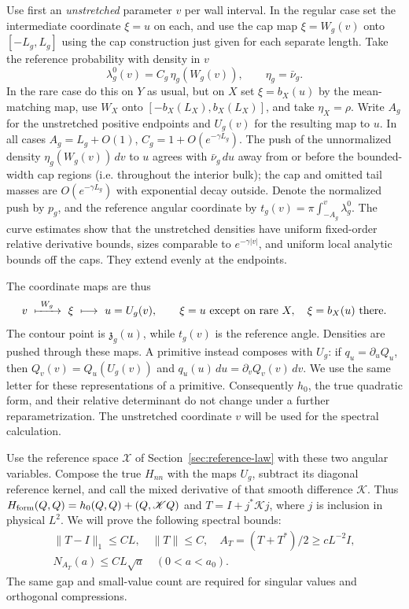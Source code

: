 Use first an \emph{unstretched} parameter $v$ per wall interval. In the regular case set the intermediate coordinate \(\xi=u\) on each, and use the cap map \(\xi=W_g(v)\) onto \([-L_g,L_g]\) using the cap construction just given for each separate length. Take the reference probability with density in \(v\)
\[
 \lambda_g^0(v)=C_g\,\eta_g(W_g(v)),\qquad \eta_g=\bar\nu_g .
\]
In the rare case do this on \(Y\) as usual, but on \(X\) set \(\xi=b_X(u)\) by the mean-matching map, use \(W_X\) onto \([-b_X(L_X),b_X(L_X)]\), and take \(\eta_X=\rho\). Write \(A_g\) for the unstretched positive endpoints and \(U_g(v)\) for the resulting map to \(u\). In all cases \(A_g=L_g+O(1)\), \(C_g=1+O(e^{-\gamma L_g})\). The push of the unnormalized density \(\eta_g(W_g(v))\,dv\) to \(u\) agrees with \(\bar\nu_g\,du\) away from or before the bounded-width cap regions (i.e. throughout the interior bulk); the cap and omitted tail masses are \(O(e^{-\gamma L_g})\) with exponential decay outside. Denote the normalized push by \(p_g\), and the reference angular coordinate by \(t_g(v)=\pi\int_{-A_g}^v\lambda_g^0\). The curve estimates show that the unstretched densities have uniform fixed-order relative derivative bounds, sizes comparable to $e^{-\gamma|v|}$, and uniform local analytic bounds off the caps. They extend evenly at the endpoints.

The coordinate maps are thus
\[
 v\ \xmapsto{\ W_g\ }\ \xi\ \longmapsto\ u=U_g(v),
 \qquad
 \xi=u\ \text{except on rare }X,\quad \xi=b_X(u)\ \text{there}.
\]
The contour point is $\mathfrak z_g(u)$, while $t_g(v)$ is the
reference angle. Densities are pushed through these maps. A primitive
instead composes with $U_g$: if $q_u=\partial_uQ_u$,
then $Q_v(v)=Q_u(U_g(v))$ and $q_u(u)\,du=\partial_vQ_v(v)\,dv$.
We use the same letter for these representations of a primitive.
Consequently $h_0$, the true quadratic form, and their relative
determinant do not change under a further reparametrization. The
unstretched coordinate $v$ will be used for the spectral calculation.

Use the reference space $\mathcal X$ of Section~\ref{sec:reference-law}
with these two angular variables. Compose the true $H_{nn}$ with the
maps $U_g$, subtract its diagonal reference kernel, and call the
mixed derivative of that smooth difference $\mathscr K$.
Thus $H_{\rm form}(Q,Q)=h_0(Q,Q)+(Q,\mathscr KQ)$ and
$T=I+j^*\mathscr K j$, where $j$ is inclusion in physical $L^2$.
We will prove the following spectral bounds:
\begin{equation}\label{eq:G-8}
 \begin{gathered}
 \|T-I\|_1\le CL,\quad\|T\|\le C,\quad
 A_T=(T+T^*)/2\ge cL^{-2}I,\\
 N_{A_T}(a)\le CL\sqrt a\quad(0<a<a_0).
 \end{gathered}
\end{equation}
The same gap and small-value count are required for singular values
and orthogonal compressions.

